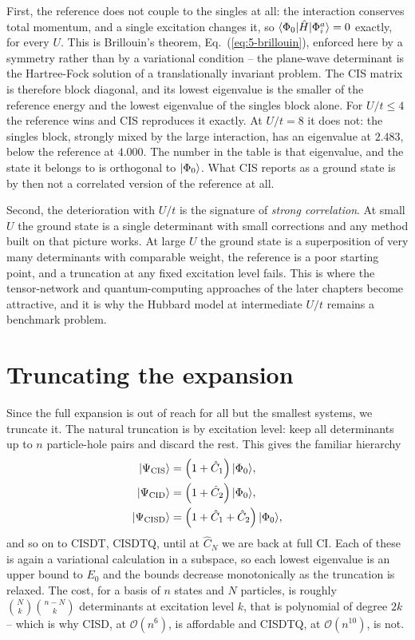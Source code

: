 First, the reference does not couple to the singles at all: the interaction
conserves total momentum, and a single excitation changes it, so
$\langle \Phi_0 | \hat{H} | \Phi_i^a \rangle=0$ exactly, for every $U$.  This is
Brillouin's theorem, Eq.~(\ref{eq:5-brillouin}), enforced here by a symmetry
rather than by a variational condition -- the plane-wave determinant is the
Hartree-Fock solution of a translationally invariant problem.  The CIS matrix
is therefore block diagonal, and its lowest eigenvalue is the smaller of the
reference energy and the lowest eigenvalue of the singles block alone.  For
$U/t\le 4$ the reference wins and CIS reproduces it exactly.  At $U/t=8$ it
does not: the singles block, strongly mixed by the large interaction, has an
eigenvalue at $2.483$, below the reference at $4.000$.  The number in the
table is that eigenvalue, and the state it belongs to is orthogonal to
$\vert \Phi_0 \rangle$.  What CIS reports as a ground state is by then not a
correlated version of the reference at all.

Second, the deterioration with $U/t$ is the signature of \emph{strong
correlation}.  At small $U$ the ground state is a single determinant with
small corrections and any method built on that picture works.  At large $U$
the ground state is a superposition of very many determinants with comparable
weight, the reference is a poor starting point, and a truncation at any fixed
excitation level fails.  This is where the tensor-network and quantum-computing
approaches of the later chapters become attractive, and it is why the Hubbard
model at intermediate $U/t$ remains a benchmark problem.

\section{Truncating the expansion}
\label{sec:citruncations}

Since the full expansion is out of reach for all but the smallest systems, we
truncate it.  The natural truncation is by excitation level: keep all
determinants up to $n$ particle-hole pairs and discard the rest.  This gives
the familiar hierarchy
\begin{align}
  \vert \Psi_{\mathrm{CIS}} \rangle &=
    \left(1+\hat{C}_1\right)\vert \Phi_0 \rangle,
  \label{eq:5-cis}\\
  \vert \Psi_{\mathrm{CID}} \rangle &=
    \left(1+\hat{C}_2\right)\vert \Phi_0 \rangle,
  \label{eq:5-cid}\\
  \vert \Psi_{\mathrm{CISD}} \rangle &=
    \left(1+\hat{C}_1+\hat{C}_2\right)\vert \Phi_0 \rangle,
  \label{eq:5-cisd}
\end{align}
and so on to CISDT, CISDTQ, until at $\hat{C}_N$ we are back at full CI.
Each of these is again a variational calculation in a subspace, so each
lowest eigenvalue is an upper bound to $E_0$ and the bounds decrease
monotonically as the truncation is relaxed.  The cost, for a basis of $n$
states and $N$ particles, is roughly $\binom{N}{k}\binom{n-N}{k}$ determinants
at excitation level $k$, that is polynomial of degree $2k$ -- which is why
CISD, at $\mathcal{O}(n^6)$, is affordable and CISDTQ, at
$\mathcal{O}(n^{10})$, is not.

